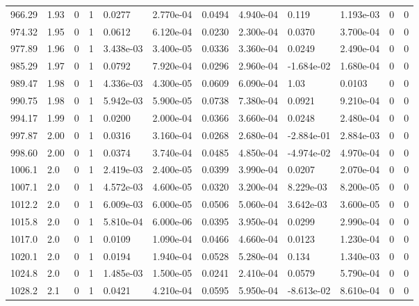 \documentclass[preview]{standalone}
\begin{document}
{{{{{{{{{{{{{{{{{{{\begin{tabular}{L{1.2cm}C{1.2cm} C{0.3cm}C{0.5cm} C{1.4cm}C{1.4cm} C{1.4cm}C{1.4cm} C{1.6cm}C{1.6cm} C{1.6cm}C{1.6cm}}
  966.29  &  1.93  & 0     &  1 &  0.0277  & 2.770e-04  &  0.0494&   4.940e-04& 0.119 & 1.193e-03   &  0 & 0  \\ 
  974.32  &  1.95  & 0     &  1 &  0.0612  & 6.120e-04  &  0.0230&   2.300e-04& 0.0370 & 3.700e-04   &  0 & 0  \\ 
  977.89  &  1.96  & 0     &  1 &  3.438e-03  & 3.400e-05  &  0.0336&   3.360e-04& 0.0249 & 2.490e-04   &  0 & 0  \\ 
  985.29  &  1.97  & 0     &  1 &  0.0792  & 7.920e-04  &  0.0296&   2.960e-04& -1.684e-02 & 1.680e-04   &  0 & 0  \\ 
  989.47  &  1.98  & 0     &  1 &  4.336e-03  & 4.300e-05  &  0.0609&   6.090e-04& 1.03 & 0.0103   &  0 & 0  \\ 
  990.75  &  1.98  & 0     &  1 &  5.942e-03  & 5.900e-05  &  0.0738&   7.380e-04& 0.0921 & 9.210e-04   &  0 & 0  \\ 
  994.17  &  1.99  & 0     &  1 &  0.0200  & 2.000e-04  &  0.0366&   3.660e-04& 0.0248 & 2.480e-04   &  0 & 0  \\ 
  997.87  &  2.00  & 0     &  1 &  0.0316  & 3.160e-04  &  0.0268&   2.680e-04& -2.884e-01 & 2.884e-03   &  0 & 0  \\ 
  998.60  &  2.00  & 0     &  1 &  0.0374  & 3.740e-04  &  0.0485&   4.850e-04& -4.974e-02 & 4.970e-04   &  0 & 0  \\ 
  1006.1  &   2.0  & 0     &  1 &  2.419e-03  & 2.400e-05  &  0.0399&   3.990e-04& 0.0207 & 2.070e-04   &  0 & 0  \\ 
  1007.1  &   2.0  & 0     &  1 &  4.572e-03  & 4.600e-05  &  0.0320&   3.200e-04& 8.229e-03 & 8.200e-05   &  0 & 0  \\ 
  1012.2  &   2.0  & 0     &  1 &  6.009e-03  & 6.000e-05  &  0.0506&   5.060e-04& 3.642e-03 & 3.600e-05   &  0 & 0  \\ 
  1015.8  &   2.0  & 0     &  1 &  5.810e-04  & 6.000e-06  &  0.0395&   3.950e-04& 0.0299 & 2.990e-04   &  0 & 0  \\ 
  1017.0  &   2.0  & 0     &  1 &  0.0109  & 1.090e-04  &  0.0466&   4.660e-04& 0.0123 & 1.230e-04   &  0 & 0  \\ 
  1020.1  &   2.0  & 0     &  1 &  0.0194  & 1.940e-04  &  0.0528&   5.280e-04& 0.134 & 1.340e-03   &  0 & 0  \\ 
  1024.8  &   2.0  & 0     &  1 &  1.485e-03  & 1.500e-05  &  0.0241&   2.410e-04& 0.0579 & 5.790e-04   &  0 & 0  \\ 
  1028.2  &   2.1  & 0     &  1 &  0.0421  & 4.210e-04  &  0.0595&   5.950e-04& -8.613e-02 & 8.610e-04   &  0 & 0  \\ 

\end{tabular}}}}}}}}}}}}}}}}}}}}
\end{document}
